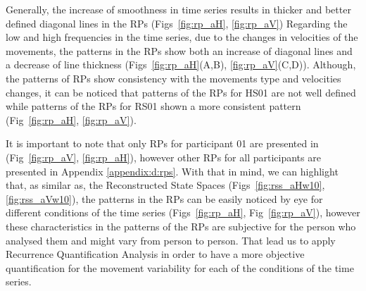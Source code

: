 Generally, the increase of smoothness in time series results in thicker 
and better defined diagonal lines in the RPs 
(Figs~\ref{fig:rp_aH}, \ref{fig:rp_aV}) 
Regarding the low and high frequencies in the time series, due to the 
changes in velocities of the movements, the patterns in the RPs 
show both an increase of diagonal lines and a decrease of line thickness
(Figs~\ref{fig:rp_aH}(A,B), \ref{fig:rp_aV}(C,D)).
Although, the patterns of RPs show consistency with the movements type 
and velocities changes, it can be noticed that patterns of the RPs for 
HS01 are not well defined while patterns of the RPs for RS01 
shown a more consistent pattern (Fig~\ref{fig:rp_aH}, \ref{fig:rp_aV}). 

It is important to note that only RPs for participant 01 are presented
in (Fig~\ref{fig:rp_aV}, \ref{fig:rp_aH}), however
other RPs for all participants are presented in Appendix \ref{appendix:d:rps}.
With that in mind, we can highlight that, as similar as, the 
Reconstructed State Spaces (Figs~\ref{fig:rss_aHw10}, \ref{fig:rss_aVw10}), 
the patterns in the RPs can be easily noticed by eye for different conditions 
of the time series (Figs~\ref{fig:rp_aH}, Fig~\ref{fig:rp_aV}),
however these characteristics in the patterns of the RPs are subjective 
for the person who analysed them and might vary from person to person. 
That lead us to apply Recurrence Quantification Analysis in order to have 
a more objective quantification for the movement variability for each of 
the conditions of the time series.
